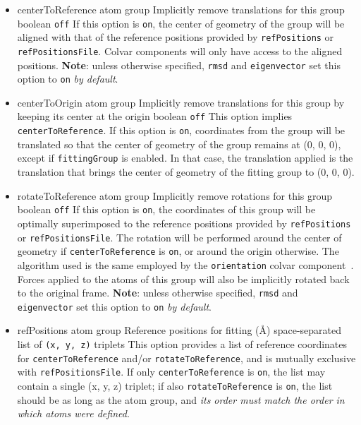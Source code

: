 \begin{itemize}

\item %
  \keydef
    {centerToReference}{%
    atom group}{%
    Implicitly remove translations for this group}{%
    boolean}{%
    \texttt{off}}{%
    If this option is \texttt{on}, the center of geometry of the group will be aligned with that of the reference positions provided by  \texttt{refPositions} or \texttt{refPositionsFile}.
    Colvar components will only have access to the aligned positions.
\textbf{Note}: unless otherwise specified, \texttt{rmsd} and \texttt{eigenvector} set this option to \texttt{on} \emph{by default}.
}

\item %
  \keydef
    {centerToOrigin}{%
    atom group}{%
    Implicitly remove translations for this group by keeping its center at the origin}{%
    boolean}{%
    \texttt{off}}{%
    This option implies \texttt{centerToReference}.
    If this option is \texttt{on}, coordinates from the group will be translated so that the center of geometry of the group remains at (0, 0, 0), except if 
    \texttt{fittingGroup} is enabled.
    In that case, the translation applied is the translation that brings the center of geometry of the fitting group to (0, 0, 0).
}

\item %
  \keydef
    {rotateToReference}{%
    atom group}{%
    Implicitly remove rotations for this group}{%
    boolean}{%
    \texttt{off}}{%
    If this option is \texttt{on}, the coordinates of this group will be optimally superimposed to the reference positions provided by  \texttt{refPositions} or \texttt{refPositionsFile}.
    The rotation will be performed around the center of geometry if \texttt{centerToReference} is \texttt{on}, or around the origin otherwise.
    The algorithm used is the same employed by the \texttt{orientation} colvar component~\cite{Coutsias2004}.
    Forces applied to the atoms of this group will also be implicitly rotated back to the original frame.
    \textbf{Note}: unless otherwise specified, \texttt{rmsd} and \texttt{eigenvector} set this option to \texttt{on} \emph{by default}.
}

\item %
  \key%
    {refPositions}{%
    atom group}{%
    Reference positions for fitting (\AA)}{%
    space-separated list of \texttt{(x, y, z)} triplets}{%
    \label{key:colvars:atom_group:refPositions}
    This option provides a list of reference coordinates for \texttt{centerToReference} and/or \texttt{rotateToReference}, and is mutually exclusive with \texttt{refPositionsFile}.
    If only \texttt{centerToReference} is \texttt{on}, the list may contain a single (x, y, z) triplet; if also \texttt{rotateToReference} is \texttt{on}, the list should be as long as the atom group, and \emph{its order must match the order in which atoms were defined}.
}


\end{itemize}
